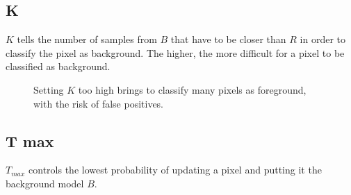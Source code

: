 \subsection*{K}
$K$ tells the number of samples from $B$ that have to be closer than $R$ in order to
classify the pixel as background. The higher, the more difficult for a pixel to be
classified as background.
\begin{figure}[!t]
\centering
{}
\newline
{}
\newline
{}
\caption{Setting $K$ too high brings to classify many pixels as foreground, with the risk of false positives.}
\end{figure}

\subsection*{T max}
$T_{max}$ controls the lowest probability of updating a pixel and putting it the
background model $B$.


